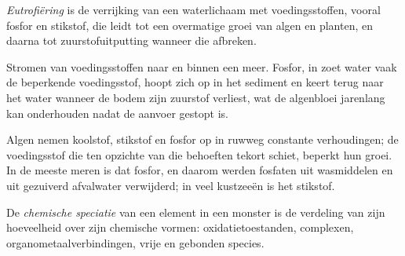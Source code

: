 \begin{definition}[Eutrofiëring]\label{def:b3:environmental-toxicology:eutrophication}
\emph{Eutrofiëring} is de verrijking van
een waterlichaam met voedingsstoffen, vooral fosfor en stikstof, die leidt
tot een overmatige groei van algen en planten, en daarna tot
zuurstofuitputting wanneer die afbreken.
\end{definition}

\begin{omfigure}

{\small Stromen van voedingsstoffen naar en binnen een meer. Fosfor, in
zoet water vaak de beperkende voedingsstof, hoopt zich op in het sediment
en keert terug naar het water wanneer de bodem zijn zuurstof verliest,
wat de algenbloei jarenlang kan onderhouden nadat de aanvoer gestopt is.}
\end{omfigure}

Algen nemen koolstof, stikstof en fosfor op in ruwweg constante
verhoudingen; de voedingsstof die ten opzichte van die behoeften tekort
schiet, beperkt hun groei. In de meeste meren is dat fosfor, en daarom
werden fosfaten uit wasmiddelen en uit gezuiverd afvalwater verwijderd;
in veel kustzeeën is het stikstof.

\begin{definition}[Speciatie]\label{def:b3:environmental-toxicology:speciation}
De \emph{chemische speciatie} van een element
in een monster is de verdeling van zijn hoeveelheid over zijn chemische
vormen: oxidatietoestanden, complexen, organometaalverbindingen, vrije en
gebonden species.
\end{definition}

